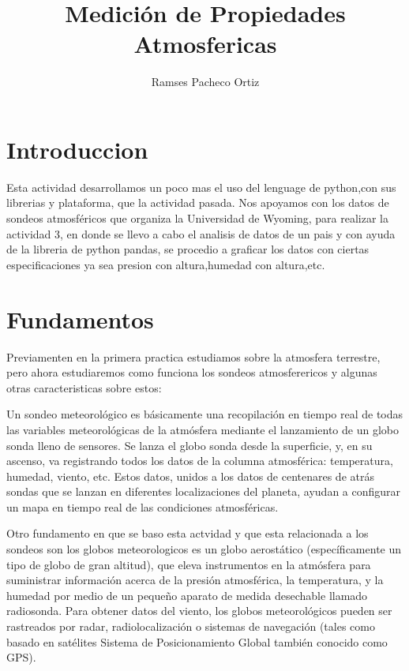 \documentclass{article}
\begin{document}
\title{Medición de Propiedades Atmosfericas}

\author{Ramses Pacheco Ortiz}

\maketitle             

\section{Introduccion}
Esta actividad desarrollamos un poco mas el uso del lenguage de python,con sus  librerias y plataforma, que la actividad pasada.
Nos apoyamos con los datos de sondeos atmosféricos que organiza la Universidad de Wyoming, para realizar la actividad 3, en donde se llevo a cabo el analisis de datos de un pais y con ayuda de la libreria de python pandas, se procedio a graficar los datos con ciertas especificaciones ya sea presion con altura,humedad con altura,etc.




\section{Fundamentos}

Previamenten en la primera practica estudiamos sobre la atmosfera terrestre, pero ahora estudiaremos como funciona los sondeos atmosferericos y algunas otras caracteristicas sobre estos:

Un sondeo meteorológico es básicamente una recopilación en tiempo real de todas las variables meteorológicas de la atmósfera mediante el lanzamiento de un globo sonda lleno de sensores. Se lanza el globo sonda desde la superficie, y, en su ascenso, va registrando todos los datos de la columna atmosférica: temperatura, humedad, viento, etc. Estos datos, unidos a los datos de centenares de atrás sondas que se lanzan en diferentes localizaciones del planeta, ayudan a configurar un mapa en tiempo real de las condiciones atmosféricas.

Otro fundamento en que se baso esta actvidad y que esta relacionada a los sondeos son los globos meteorologicos
 es un globo aerostático (específicamente un tipo de globo de gran altitud), que eleva instrumentos en la atmósfera para suministrar información acerca de la presión atmosférica, la temperatura, y la humedad por medio de un pequeño aparato de medida desechable llamado radiosonda. Para obtener datos del viento, los globos meteorológicos pueden ser rastreados por radar, radiolocalización o sistemas de navegación (tales como basado en satélites Sistema de Posicionamiento Global también conocido como GPS).
 
\end{document}
